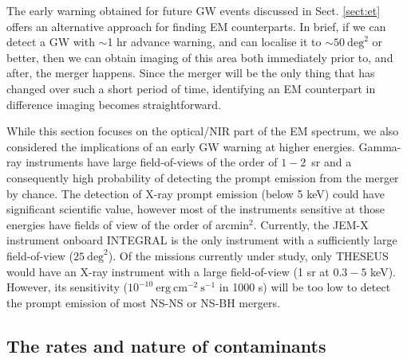 \documentclass{aa}
\begin{document}
The early warning obtained for future GW events discussed in Sect. \ref{sect:et} offers an alternative approach for finding EM counterparts. In brief, if we can detect a GW with $\sim$1 hr advance warning, and can localise it to $\sim50~\mathrm{deg}^2$ or better, then we can obtain imaging of this area both immediately prior to, and after, the merger happens. Since the merger will be the only thing that has changed over such a short period of time, identifying an EM counterpart in difference imaging becomes straightforward.

While this section focuses on the optical/NIR part of the EM spectrum, 
we also considered the implications of an early GW warning at higher energies. Gamma-ray instruments have large field-of-views of the order of $1-2$~sr and a consequently high probability of detecting the prompt emission from the merger by chance. %
The detection of X-ray prompt emission (below 5 keV) could have significant scientific value, however most of the instruments sensitive at those energies have fields of view of the order of arcmin$^2$. Currently, the JEM-X instrument onboard INTEGRAL is the only instrument with a sufficiently large field-of-view ($25~\mathrm{deg}^2$). Of the missions currently under study, only THESEUS \citep{2018AdSpR..62..191A} would have an X-ray instrument with a large field-of-view (1 sr at $0.3-5$ keV). However, its sensitivity ($10^{-10}~\mathrm{erg}~\mathrm{cm}^{-2}~\mathrm{s}^{-1}$ in 1000 s) will be too low to detect the prompt emission of most NS-NS or NS-BH mergers.

\subsection{The rates and nature of contaminants}
\end{document}
